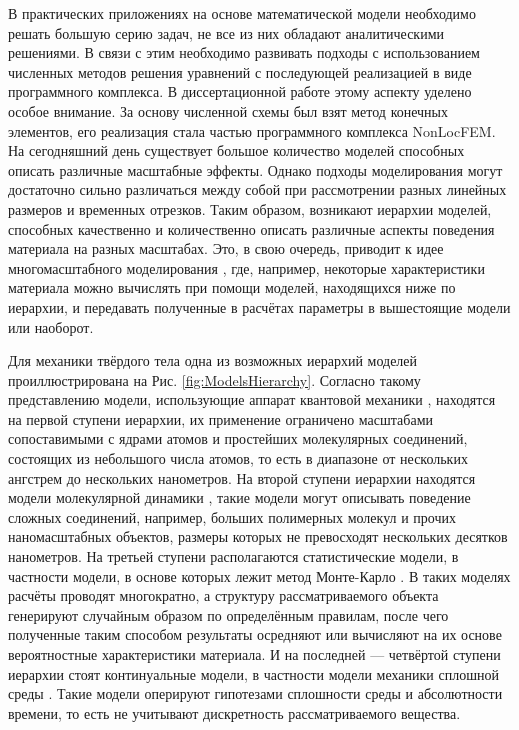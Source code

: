 \ifsynopsis
В практических приложениях на основе математической модели необходимо решать большую серию задач, не все из них обладают аналитическими решениями. В связи с этим необходимо развивать подходы с использованием численных методов решения уравнений с последующей реализацией в виде программного комплекса. В диссертационной работе этому аспекту уделено особое внимание. За основу численной схемы был взят метод конечных элементов, его реализация стала частью программного комплекса NonLocFEM.
\nocite{AMCSM2019}
		\nocite{ZAMM}
		\nocite{NonlocalSaintVenant}
		\nocite{NonlocalRadiation}
\else
На сегодняшний день существует большое количество моделей способных описать различные масштабные эффекты. Однако подходы моделирования могут достаточно сильно различаться между собой при рассмотрении разных линейных размеров и временных отрезков. Таким образом, возникают иерархии моделей, способных качественно и количественно описать различные аспекты поведения материала на разных масштабах. Это, в свою очередь, приводит к идее многомасштабного моделирования \cite{Multiscale1}, где, например, некоторые характеристики материала можно вычислять при помощи моделей, находящихся ниже по иерархии, и передавать полученные в расчётах параметры в вышестоящие модели или наоборот.
\fi

\ifsynopsis
\else
Для механики твёрдого тела одна из возможных иерархий моделей проиллюстрирована на Рис. \ref{fig:ModelsHierarchy}. Согласно такому представлению модели, использующие аппарат квантовой механики \cite{QuantumModelling1, QuantumModelling2}, находятся на первой ступени иерархии, их применение ограничено масштабами сопоставимыми с ядрами атомов и простейших молекулярных соединений, состоящих из небольшого числа атомов, то есть в диапазоне от нескольких ангстрем до нескольких нанометров. На второй ступени иерархии находятся модели молекулярной динамики \cite{MD1, MD2, MD3, MD4}, такие модели могут описывать поведение сложных соединений, например, больших полимерных молекул и прочих наномасштабных объектов, размеры которых не превосходят нескольких десятков нанометров. На третьей ступени располагаются статистические модели, в частности модели, в основе которых лежит метод Монте-Карло \cite{MonteCarlo1, MonteCarlo2}. В таких моделях расчёты проводят многократно, а структуру рассматриваемого объекта генерируют случайным образом по определённым правилам, после чего полученные таким способом результаты осредняют или вычисляют на их основе вероятностные характеристики материала. И на последней --- четвёртой ступени иерархии стоят континуальные модели, в частности модели механики сплошной среды \cite{MSS}. Такие модели оперируют гипотезами сплошности среды и абсолютности времени, то есть не учитывают дискретность рассматриваемого вещества.
\fi

